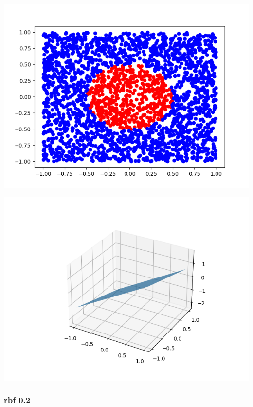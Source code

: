 \documentclass[11pt]{article}
\begin{document}
\begin{center}
\includegraphics[scale=0.7]{./res/ac_points_rbf_0.05.png}
\end{center}

\begin{center}
\includegraphics[scale=0.7]{./res/ac_surface_linear_0.25.png}
\end{center}

\subsubsection*{rbf 0.2}
\label{sec:org5c4c3f8}
\end{document}
